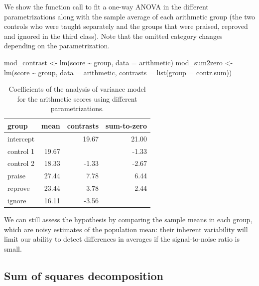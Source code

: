 \documentclass[
  11pt,
  letterpaper,
]{scrbook}
\newenvironment{Shaded}{\begin{snugshade}}{\end{snugshade}}
\newcommand{\AttributeTok}[1]{\textcolor[rgb]{0.40,0.45,0.13}{#1}}
\newcommand{\FunctionTok}[1]{\textcolor[rgb]{0.28,0.35,0.67}{#1}}
\newcommand{\NormalTok}[1]{\textcolor[rgb]{0.00,0.23,0.31}{#1}}
\newcommand{\OtherTok}[1]{\textcolor[rgb]{0.00,0.23,0.31}{#1}}
\newcommand{\SpecialCharTok}[1]{\textcolor[rgb]{0.37,0.37,0.37}{#1}}
\theoremstyle{definition}
\theoremstyle{remark}
\begin{document}
We show the function call to fit a one-way ANOVA in the different
parametrizations along with the sample average of each arithmetic group
(the two controls who were taught separately and the groups that were
praised, reproved and ignored in the third class). Note that the omitted
category changes depending on the parametrization.

\begin{Shaded}
\begin{Highlighting}[]
\NormalTok{mod\_contrast }\OtherTok{\textless{}{-}} \FunctionTok{lm}\NormalTok{(score }\SpecialCharTok{\textasciitilde{}}\NormalTok{ group, }
                   \AttributeTok{data =}\NormalTok{ arithmetic)}
\NormalTok{mod\_sum2zero }\OtherTok{\textless{}{-}} \FunctionTok{lm}\NormalTok{(score }\SpecialCharTok{\textasciitilde{}}\NormalTok{ group, }
                   \AttributeTok{data =}\NormalTok{ arithmetic,}
                   \AttributeTok{contrasts =} \FunctionTok{list}\NormalTok{(}\AttributeTok{group =}\NormalTok{ contr.sum))}
\end{Highlighting}
\end{Shaded}

\hypertarget{tbl-tableanovaparam}{}
\begin{table}
\caption{\label{tbl-tableanovaparam}Coefficients of the analysis of variance model for the arithmetic scores
using different parametrizations. }\tabularnewline

\centering
\begin{tabular}{lrrr}
\toprule
group & mean & contrasts & sum-to-zero\\
\midrule
intercept &  & 19.67 & 21.00\\
control 1 & 19.67 &  & -1.33\\
control 2 & 18.33 & -1.33 & -2.67\\
praise & 27.44 & 7.78 & 6.44\\
reprove & 23.44 & 3.78 & 2.44\\
\addlinespace
ignore & 16.11 & -3.56 & \\
\bottomrule
\end{tabular}
\end{table}

We can still assess the hypothesis by comparing the sample means in each
group, which are noisy estimates of the population mean: their inherent
variability will limit our ability to detect differences in averages if
the signal-to-noise ratio is small.

\hypertarget{sum-of-squares-decomposition}{%
\subsection{Sum of squares
decomposition}\label{sum-of-squares-decomposition}}
\end{document}
